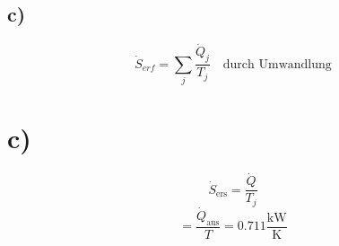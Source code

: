 

\subsection*{c)}

\[
\dot{S}_{erf} = \sum_j \frac{\dot{Q}_j}{T_j} \quad \text{durch Umwandlung}
\]



\section*{c)}
\begin{equation*}
    \dot{S}_{\text{ers}} = \frac{\dot{Q}}{T_j}
\end{equation*}
\begin{equation*}
    = \frac{\dot{Q}_{\text{aus}}}{T} = 0.711 \frac{\text{kW}}{\text{K}}
\end{equation*}